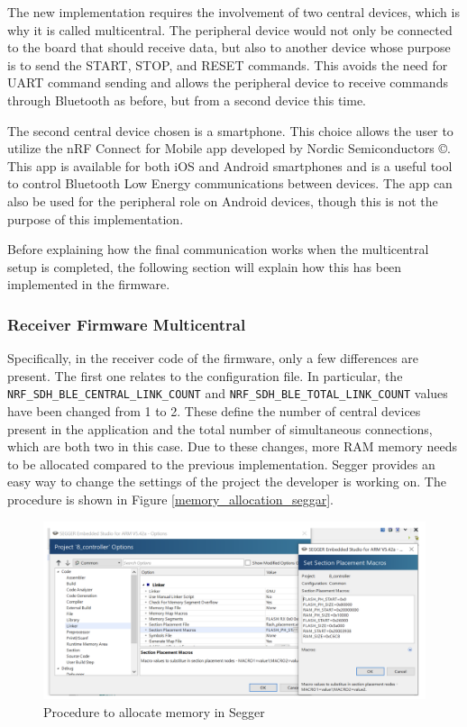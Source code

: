 \documentclass{Configuration_Files/PoliMi3i_thesis}
\begin{document}
The new implementation requires the involvement of two central devices, which is why it is called multicentral. The peripheral device would not only be connected to the board that should receive data, but also to another device whose purpose is to send the START, STOP, and RESET commands. This avoids the need for UART command sending and allows the peripheral device to receive commands through Bluetooth as before, but from a second device this time.

The second central device chosen is a smartphone. This choice allows the user to utilize the nRF Connect for Mobile app developed by Nordic Semiconductors ©. This app is available for both iOS and Android smartphones and is a useful tool to control Bluetooth Low Energy communications between devices. The app can also be used for the peripheral role on Android devices, though this is not the purpose of this implementation.

Before explaining how the final communication works when the multicentral setup is completed, the following section will explain how this has been implemented in the firmware.

\subsubsection{Receiver Firmware Multicentral}
Specifically, in the receiver code of the firmware, only a few differences are present. The first one relates to the configuration file. In particular, the \texttt{NRF\_SDH\_BLE\_CENTRAL\_LINK\_COUNT} and \texttt{NRF\_SDH\_BLE\_TOTAL\_LINK\_COUNT} values have been changed from 1 to 2. These define the number of central devices present in the application and the total number of simultaneous connections, which are both two in this case. Due to these changes, more RAM memory needs to be allocated compared to the previous implementation. Segger provides an easy way to change the settings of the project the developer is working on. The procedure is shown in Figure \ref{memory_allocation_seggar}.

\begin{figure}[H]
    \centering
    \includegraphics[scale=0.5]{Multicentral/3.png}
    \caption{Procedure to allocate memory in Segger}
    \label{multicentral_3}
\end{figure}
\end{document}
